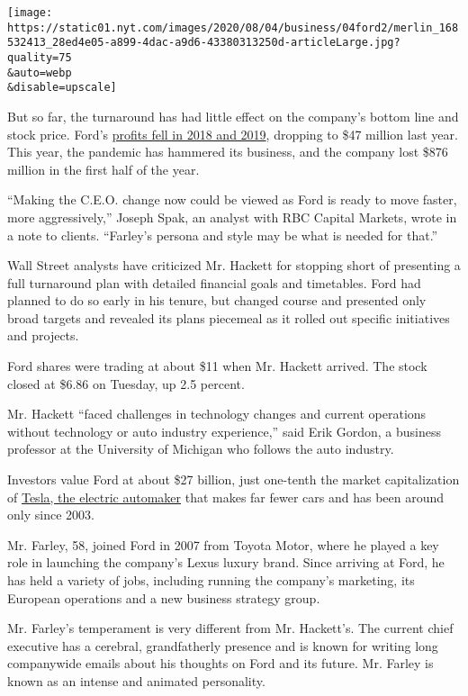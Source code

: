 \texttt{[image: https://static01.nyt.com/images/2020/08/04/business/04ford2/merlin\_168532413\_28ed4e05-a899-4dac-a9d6-43380313250d-articleLarge.jpg?quality=75\\\&auto=webp\\\&disable=upscale]}

But so far, the turnaround has had little effect on the company's bottom
line and stock price. Ford's
\href{https://s23.q4cdn.com/799033206/files/doc_financials/quarterly/2019/q4/Ford-4Q2019-Earnings-Press-Release.pdf}{profits
fell in 2018 and 2019}, dropping to \$47 million last year. This year,
the pandemic has hammered its business, and the company lost \$876
million in the first half of the year.

``Making the C.E.O. change now could be viewed as Ford is ready to move
faster, more aggressively,'' Joseph Spak, an analyst with RBC Capital
Markets, wrote in a note to clients. ``Farley's persona and style may be
what is needed for that.''

Wall Street analysts have criticized Mr. Hackett for stopping short of
presenting a full turnaround plan with detailed financial goals and
timetables. Ford had planned to do so early in his tenure, but changed
course and presented only broad targets and revealed its plans piecemeal
as it rolled out specific initiatives and projects.

Ford shares were trading at about \$11 when Mr. Hackett arrived. The
stock closed at \$6.86 on Tuesday, up 2.5 percent.

Mr. Hackett ``faced challenges in technology changes and current
operations without technology or auto industry experience,'' said Erik
Gordon, a business professor at the University of Michigan who follows
the auto industry.

Investors value Ford at about \$27 billion, just one-tenth the market
capitalization of
\href{https://www.nytimes.com/topic/company/tesla-motors-inc}{Tesla, the
electric automaker} that makes far fewer cars and has been around only
since 2003.

Mr. Farley, 58, joined Ford in 2007 from Toyota Motor, where he played a
key role in launching the company's Lexus luxury brand. Since arriving
at Ford, he has held a variety of jobs, including running the company's
marketing, its European operations and a new business strategy group.

Mr. Farley's temperament is very different from Mr. Hackett's. The
current chief executive has a cerebral, grandfatherly presence and is
known for writing long companywide emails about his thoughts on Ford and
its future. Mr. Farley is known as an intense and animated personality.

